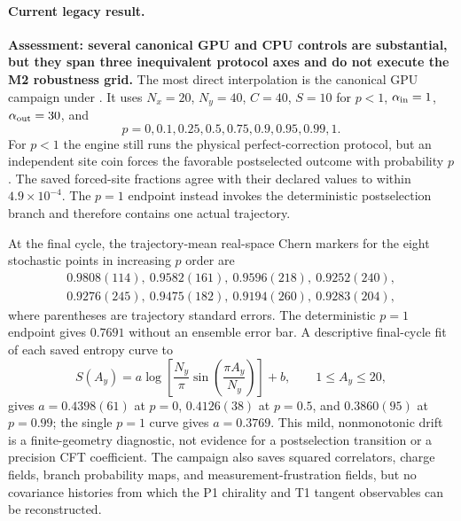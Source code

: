 \documentclass[aps,prx,twocolumn,floatfix,nofootinbib,superscriptaddress,longbibliography]{revtex4-2}
\begin{document}
\paragraph*{Current legacy result.}
\textbf{Assessment: several canonical GPU and CPU controls are substantial, but they span
three inequivalent protocol axes and do not execute the M2 robustness grid.}  The most
direct interpolation is the canonical GPU campaign under
.  It uses $N_x=20$, $N_y=40$, $C=40$,
$S=10$ for $p<1$, $\alpha_{\rm in}=1$, $\alpha_{\rm out}=30$, and
\begin{equation}
 p=0,0.1,0.25,0.5,0.75,0.9,0.95,0.99,1.
 \label{eq:M2-legacy-p-grid}
\end{equation}
For $p<1$ the engine still runs the physical perfect-correction protocol, but an
independent site coin forces the favorable postselected outcome with probability $p$.
The saved forced-site fractions agree with their declared values to within
$4.9\times10^{-4}$.  The $p=1$ endpoint instead invokes the deterministic postselection
branch and therefore contains one actual trajectory.

At the final cycle, the trajectory-mean real-space Chern markers for the eight stochastic
points in increasing $p$ order are
\begin{equation}
 \begin{gathered}
 0.9808(114),\ 0.9582(161),\ 0.9596(218),\ 0.9252(240),\\
 0.9276(245),\ 0.9475(182),\ 0.9194(260),\ 0.9283(204),
 \end{gathered}
 \label{eq:M2-legacy-chern-p-sweep}
\end{equation}
where parentheses are trajectory standard errors.  The deterministic $p=1$ endpoint gives
$0.7691$ without an ensemble error bar.  A descriptive final-cycle fit of each saved
entropy curve to
\begin{equation}
 S(A_y)=a\log\!\left[\frac{N_y}{\pi}\sin\!\left(\frac{\pi A_y}{N_y}\right)\right]+b,
 \qquad 1\leq A_y\leq20,
 \label{eq:M2-legacy-entropy-diagnostic}
\end{equation}
gives $a=0.4398(61)$ at $p=0$, $0.4126(38)$ at $p=0.5$, and $0.3860(95)$ at
$p=0.99$; the single $p=1$ curve gives $a=0.3769$.  This mild, nonmonotonic drift is a
finite-geometry diagnostic, not evidence for a postselection transition or a precision
CFT coefficient.  The campaign also saves squared correlators, charge fields, branch
probability maps, and measurement-frustration fields, but no covariance histories from
which the P1 chirality and T1 tangent observables can be reconstructed.
\end{document}
